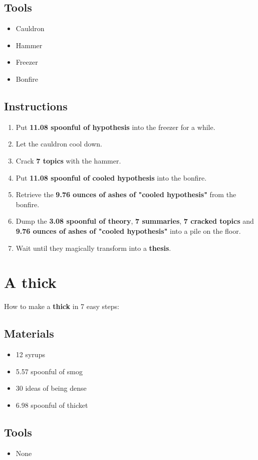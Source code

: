 \documentclass{article}
\begin{document}
\subsection{Tools}\begin{itemize}
\item 
Cauldron
\item 
Hammer
\item 
Freezer
\item 
Bonfire
\end{itemize}
\subsection{Instructions}\begin{enumerate}
\item 
Put \textbf{11.08 spoonful of hypothesis} into the freezer for a while.
\item 
Let the cauldron cool down.
\item 
Crack \textbf{7 topics} with the hammer.
\item 
Put \textbf{11.08 spoonful of cooled hypothesis} into the bonfire.
\item 
Retrieve the \textbf{9.76 ounces of ashes of "cooled hypothesis"} from the bonfire.
\item 
Dump the \textbf{3.08 spoonful of theory}, \textbf{7 summaries}, \textbf{7 cracked topics} and \textbf{9.76 ounces of ashes of "cooled hypothesis"} into a pile on the floor.
\item 
Wait until they magically transform into a \textbf{thesis}.
\end{enumerate}
\newpage
\section{A thick}How to make a \textbf{thick} in 7 easy steps:

\subsection{Materials}\begin{itemize}
\item 
12 syrups
\item 
5.57 spoonful of smog
\item 
30 ideas of being dense
\item 
6.98 spoonful of thicket
\end{itemize}
\subsection{Tools}\begin{itemize}
\item 
None
\end{itemize}
\end{document}

